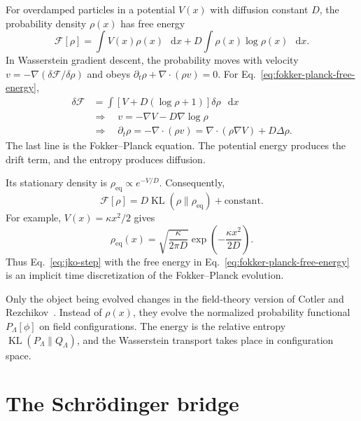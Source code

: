 \documentclass[11pt]{article}
\newcommand{\dd}{\mathop{}\!\mathrm{d}}
\newcommand{\KL}{\operatorname{KL}}
\begin{document}
For overdamped particles in a potential $V(x)$ with diffusion constant $D$,
the probability density $\rho(x)$ has free energy
\begin{equation}
  \mathcal F[\rho]
  =\int V(x)\rho(x)\,\dd x
   +D\int\rho(x)\log\rho(x)\,\dd x.
  \label{eq:fokker-planck-free-energy}
\end{equation}
In Wasserstein gradient descent, the probability moves with velocity
$v=-\nabla(\delta\mathcal F/\delta\rho)$ and obeys
$\partial_t\rho+\nabla\!\cdot(\rho v)=0$. For
Eq.~\eqref{eq:fokker-planck-free-energy},
\begin{equation}
  \begin{aligned}
    \delta\mathcal F
    &=\int\left[V+D(\log\rho+1)\right]\delta\rho\,\dd x
    \\[2pt]
    &\Longrightarrow\quad
    v=-\nabla V-D\nabla\log\rho
    \\[2pt]
    &\Longrightarrow\quad
    \partial_t\rho
    =-\nabla\!\cdot(\rho v)
    =\nabla\!\cdot(\rho\nabla V)+D\Delta\rho .
  \end{aligned}
  \label{eq:fokker-planck-gradient-flow}
\end{equation}
The last line is the Fokker--Planck equation. The potential energy produces
the drift term, and the entropy produces diffusion.

Its stationary density is $\rho_{\mathrm{eq}}\propto e^{-V/D}$. Consequently,
\begin{equation}
  \mathcal F[\rho]
  =D\KL(\rho\|\rho_{\mathrm{eq}})+\text{constant}.
  \label{eq:free-energy-relative-entropy}
\end{equation}
For example, $V(x)=\kappa x^2/2$ gives
\[
  \rho_{\mathrm{eq}}(x)
  =\sqrt{\frac{\kappa}{2\pi D}}
   \exp\left(-\frac{\kappa x^2}{2D}\right).
\]
Thus Eq.~\eqref{eq:jko-step} with the free energy in
Eq.~\eqref{eq:fokker-planck-free-energy} is an implicit time discretization
of the Fokker--Planck evolution.

Only the object being evolved changes in the field-theory version of Cotler
and Rezchikov~\cite{cotler-rezchikov-2022}. Instead of $\rho(x)$, they evolve
the normalized probability functional $P_\Lambda[\phi]$ on field
configurations. The energy is the relative entropy
$\KL(P_\Lambda\|Q_\Lambda)$, and the Wasserstein transport takes place in
configuration space.

\section{The Schr\"odinger bridge}
\end{document}
